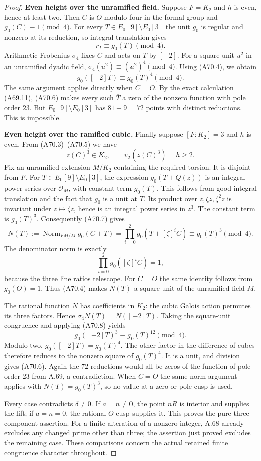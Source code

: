 \begin{proof}
\par\smallskip\noindent\textbf{Even height over the unramified field.}\enspace
Suppose $F=K_2$ and $h$ is even,
hence at least two. Then $C$ is
$O$ modulo four in the formal group
and $g_0(C)\equiv1\pmod4$.
For every $T\in E_0[9]\setminus E_0[3]$
the unit $g_0$ is regular and nonzero
at its reduction, so integral
translation gives
\[
 r_T\equiv g_0(T)\pmod4.
\]
Arithmetic Frobenius $\sigma_4$ fixes
$C$ and acts on $T$ by $[-2]$.
For a square unit $u^2$ in an
unramified dyadic field,
$\sigma_4(u^2)\equiv(u^2)^4\pmod4$.
Using (A70.4), we obtain
\[
 g_0([-2]T)\equiv g_0(T)^4\pmod4.
 \tag{A70.6}
\]
The same argument applies directly
when $C=O$. By the exact calculation
(A69.11), (A70.6) makes every such
$\overline T$ a zero of the nonzero
function with pole order $23$.
But $E_0[9]\setminus E_0[3]$ has
$81-9=72$ points with distinct
reductions. This is impossible.

\par\smallskip\noindent\textbf{Even height over the ramified cubic.}\enspace
Finally suppose $[F:K_2]=3$ and
$h$ is even. From (A70.3)--(A70.5)
we have
\[
 z(C)^3\in K_2,\qquad
 v_2(z(C)^3)=h\ge2.
 \tag{A70.7}
\]
Fix an unramified extension $M/K_2$
containing the required torsion.
It is disjoint from $F$.
For $T\in E_0[9]\setminus E_0[3]$,
the expression $g_0(T+Q(z))$ is an
integral power series over
$\mathcal O_M$, with constant term
$g_0(T)$. This follows from good
integral translation and the fact
that $g_0$ is a unit at
$\overline T$. Its product over
$z,\zeta z,\zeta^2z$ is invariant
under $z\mapsto\zeta z$, hence is
an integral power series in $z^3$.
The constant term is $g_0(T)^3$.
Consequently (A70.7) gives
\[
 N(T):=\operatorname{Norm}_{FM/M}
              g_0(C+T)
       =\prod_{i=0}^2g_0(T+[\zeta]^i C)
       \equiv g_0(T)^3\pmod4.
 \tag{A70.8}
\]
The denominator norm is exactly
\[
 \prod_{i=0}^2 g_0([\zeta]^i C)=1,
 \tag{A70.9}
\]
because the three line ratios
telescope. For $C=O$ the same
identity follows from $g_0(O)=1$.
Thus (A70.4) makes $N(T)$ a
square unit of the unramified
field $M$.

The rational function $N$ has
coefficients in $K_2$: the cubic
Galois action permutes its three
factors. Hence $\sigma_4 N(T)
=N([-2]T)$. Taking the square-unit
congruence and applying (A70.8)
yields
\[
 g_0([-2]T)^3\equiv g_0(T)^{12}\pmod4.
\]
Modulo two, $g_0([-2]T)=g_0(T)^4$.
The other factor in the difference
of cubes therefore reduces to
the nonzero square of $g_0(T)^4$.
It is a unit, and division gives
(A70.6). Again the $72$ reductions
would all be zeros of the function
of pole order $23$ from A.69,
a contradiction. When $C=O$ the
same norm argument applies with
$N(T)=g_0(T)^3$, so no value at
a zero or pole cusp is used.

Every case contradicts $\delta\ne0$.
If $a=n\ne0$, the point $nR$ is
interior and supplies the lift;
if $a=n=0$, the rational $O$-cusp
supplies it. This proves the pure
three-component assertion.
For a finite alteration of a
nonzero integer, A.68 already
excludes any changed prime other
than three; the assertion just
proved excludes the remaining
case. These comparisons concern
the actual retained finite
congruence character throughout.
\end{proof}
